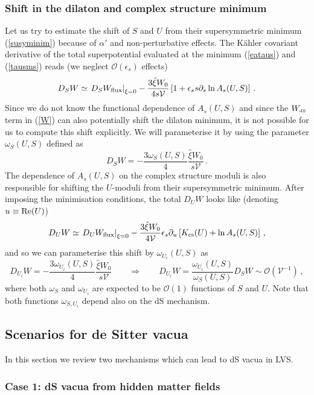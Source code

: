 \documentclass[11pt,a4paper]{article}
\newcommand{\be}{\begin{equation}}
\newcommand{\ee}{\end{equation}}
\def\dS{{\scriptscriptstyle \rm dS}}
\newcommand\vo{{\mathcal{V}}}
\newcommand{\mc}{\mathcal}
\begin{document}
\subsubsection{Shift in the dilaton and complex structure minimum}
\label{shiftsection}

Let us try to estimate the shift of $S$ and $U$ from their supersymmetric minimum (\ref{susyminim}) because of $\alpha'$
and non-perturbative effects. The K\"ahler covariant derivative of the total superpotential evaluated at the minimum (\ref{eataus}) and (\ref{tausms})
reads (we neglect $\mc{O}(\epsilon_s)$ effects)
\be
D_S W \simeq \left.D_S W_{\rm flux}\right|_{\xi = 0} - \frac{3\hat\xi W_0}{4s\vo}
\left[1 + \epsilon_s s\partial_s \ln A_s(U,S)\right]\,.
\ee
Since we do not know the functional dependence of $A_s(U,S)$ and since the $W_\dS$ term in (\ref{W})
can also potentially shift the dilaton minimum, it is not
possible for us to compute this shift explicitly. We will parameterise it by using the parameter $\omega_S(U,S)$ defined as
\be
\label{dilmin}
D_S W = - \frac{3 \omega_S(U,S)}{4} \frac{\hat\xi W_0}{s\vo}\,.
\ee
The dependence of $A_s(U, S)$ on the complex structure moduli is also responsible for shifting the $U$-moduli
from their supersymmetric minimum. After imposing the minimisation conditions, the total $D_U W$ looks like (denoting $u\equiv {\rm Re}(U)$)
\be
D_U W \simeq \left.D_U W_{\rm flux}\right|_{\xi = 0} - \frac{3\hat\xi W_0}{4\vo}
\epsilon_s \partial_u\left[K_{\rm cs}(U)+  \ln A_s(U,S)\right]\,,
\ee
and so we can parameterise this shift by $\omega_{U_i}(U,S)$ as
\be
\label{csmin}
D_{U_i} W = - \frac{3 \omega_{U_i} (U,S)}{4} \frac{\hat\xi W_0}{s\vo}
\qquad\Rightarrow\qquad D_{U_i} W =\frac{\omega_{U_i} (U,S)}{\omega_S(U,S)} D_S W\sim \mc{O}(\vo^{-1})\,,
\ee
where both $\omega_S$ and $\omega_{U_i}$ are expected to be $\mc{O}(1)$ functions of $S$ and $U$. Note that both functions $\omega_{S,U_i}$ depend also on the dS mechanism.

\subsection{Scenarios for de Sitter vacua}
\label{dsv}

In this section we review two mechanisms which can lead to dS vacua in LVS.

\subsubsection{Case 1: dS vacua from hidden matter fields}
\label{matteruplift}
\end{document}
